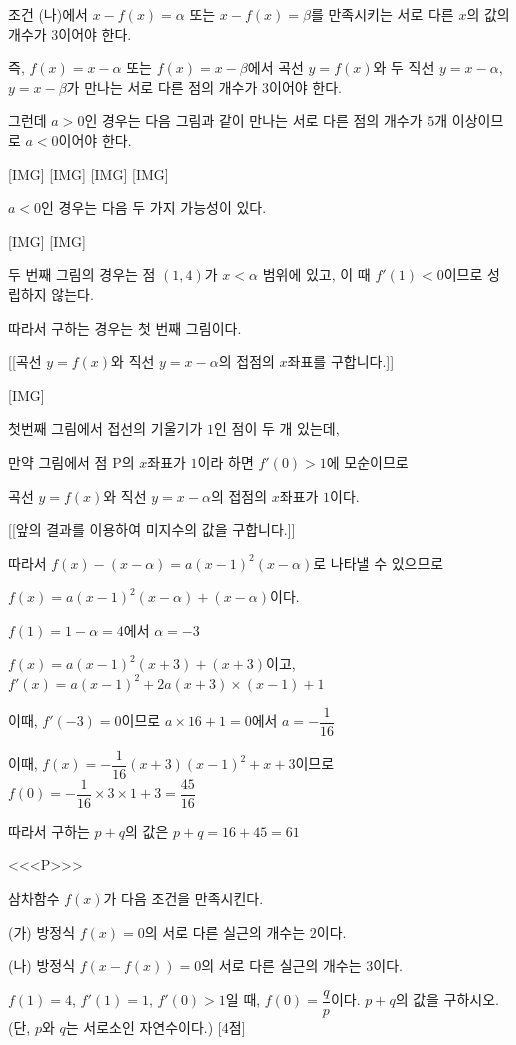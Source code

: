 \documentclass{oblivoir}
\begin{document}
조건 (나)에서 $x-f(x)=\alpha$ 또는 $x-f(x)=\beta$를 만족시키는 서로 다른 $x$의 값의 개수가 $3$이어야 한다.

즉, $f(x)=x-\alpha$ 또는 $f(x)=x-\beta$에서 곡선 $y=f(x)$와 두 직선 $y=x-\alpha$, $y=x-\beta$가 만나는 서로 다른 점의 개수가 $3$이어야 한다.

그런데 $a>0$인 경우는 다음 그림과 같이 만나는 서로 다른 점의 개수가 $5$개 이상이므로 $a<0$이어야 한다.

[IMG] [IMG] [IMG] [IMG]

$a<0$인 경우는 다음 두 가지 가능성이 있다.

[IMG] [IMG]

두 번째 그림의 경우는 점 $(1,4)$가 $x< \alpha$ 범위에 있고, 이 때 $f'(1)<0$이므로 성립하지 않는다.

따라서 구하는 경우는 첫 번째 그림이다.

[[곡선 $y=f(x)$와 직선 $y=x-\alpha$의 접점의 $x$좌표를 구합니다.]]

[IMG]

첫번째 그림에서 접선의 기울기가 $1$인 점이 두 개 있는데,

만약 그림에서 점 $\mathrm{P}$의 $x$좌표가 $1$이라 하면 $f'(0)>1$에 모순이므로

곡선 $y=f(x)$와 직선 $y=x-\alpha$의 접점의 $x$좌표가 $1$이다.

[[앞의 결과를 이용하여 미지수의 값을 구합니다.]]

따라서  $f(x)-(x-\alpha)=a(x-1)^2 (x-\alpha)$로 나타낼 수 있으므로

$f(x)=a(x-1)^2 (x-\alpha)+(x-\alpha)$이다.

$f(1)=1-\alpha =4$에서 $\alpha=-3$

$f(x)=a(x-1)^2 (x+3)+(x+3)$이고, $f'(x)=a(x-1)^{2}+2a(x+3)\times (x-1)+1$

이때, $f'(-3)=0$이므로 $a\times 16 +1=0$에서 $a= -\dfrac{1}{16}$

이때, $f(x)= -\dfrac{1}{16}(x+3)(x-1)^{2}+x+3$이므로 $f(0)= -\dfrac{1}{16}\times 3\times 1 +3 =\dfrac{45}{16}$

따라서 구하는 $p+q$의 값은 $p +q =16 +45 =61$

<<<P>>>

삼차함수 $f(x)$가 다음 조건을 만족시킨다.

(가) 방정식 $f(x)=0$의 서로 다른 실근의 개수는 $2$이다. 

(나) 방정식 $f(x-f(x))=0$의 서로 다른 실근의 개수는 $3$이다.

$f(1)=4$, $f'(1)=1$, $f'(0)>1$일 때, $f(0)=\dfrac{q}{p}$이다. $p+q$의 값을 구하시오. (단, $p$와 $q$는 서로소인 자연수이다.) [4점]
\end{document}
